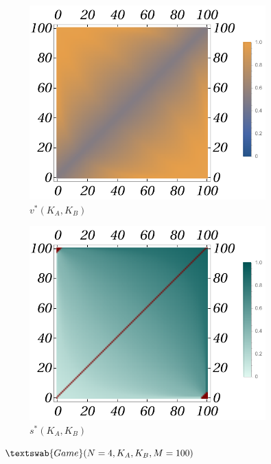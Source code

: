 \documentclass{beamer}
\theoremstyle{definition}
\newcommand{\G}[1]{$\textswab{Game}(#1)$}
\begin{document}
\begin{frame}[shrink=40]
\begin{figure}[H]
    \centering
    \begin{subfigure}[b]{0.3\textwidth}
        \includegraphics[width=\textwidth]{img/v_Plot_4_100.pdf}
        \caption{\small \centering $v^*(K_A,K_B)$}
        \label{fig:Game4__100_v}
    \end{subfigure}
    \hspace{0.05\textwidth} %
    \begin{subfigure}[b]{0.3\textwidth}
        \includegraphics[width=\textwidth]{img/s_Plot_4_100.pdf}
        \caption{\small \centering $s^*(K_A,K_B)$}
        \label{fig:Game4__100_s}
    \end{subfigure}
    \caption{\G{N=4,K_A,K_B,M=100}}
    \label{fig:Game4__100_vs}
\end{figure}



\end{frame}
\end{document}
